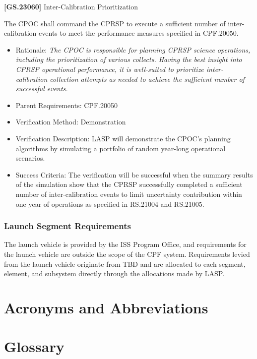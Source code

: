 \documentclass[12pt,oneside,oldfontcommands]{memoir}
\renewcommand{\entryname}{Acronym}
\renewcommand{\descriptionname}{Complete Term}
\begin{document}
\textbf{[GS.23060]} Inter-Calibration Prioritization

The \gls{CPOC} shall command the \gls{CPRSP} to execute a sufficient number of inter-calibration events to meet the performance \gls{measure}s specified in \gls{CPF}.20050.

\begin{itemize}
\item{} Rationale: \emph{The CPOC is responsible for planning CPRSP science operations, including the prioritization of various collects. Having the best insight into CPRSP operational performance, it is well-suited to prioritize inter-calibration collection attempts as needed to achieve the sufficient number of successful events.}

\item{} Parent Requirements: \gls{CPF}.20050

\item{} Verification Method: Demonstration

\item{} Verification Description: \gls{LASP} will demonstrate the \gls{CPOC}'s planning algorithms by simulating a portfolio of random year-long operational scenarios.

\item{} Success Criteria: The verification will be successful when the summary results of the simulation show that the \gls{CPRSP} successfully completed a sufficient number of inter-calibration events to limit uncertainty contribution within one year of operations as specified in \gls{RS}.21004 and \gls{RS}.21005.

\end{itemize}

\subsection{Launch Segment Requirements}
\label{launchsegmentrequirements}

The launch vehicle is provided by the \gls{ISS} Program Office, and requirements for the launch vehicle are outside the scope of the \gls{CPF} system. Requirements levied from the launch vehicle originate from TBD\label{tbx_2} and are allocated to each segment, element, and subsystem directly through the allocations made by \gls{LASP}.


\begin{appendices}


\chapter{Acronyms and Abbreviations  }
\label{sec_acros}

\printglossary[type=\acronymtype]

\chapter{Glossary  }
\label{sec_gls}


\renewcommand{\entryname}{Term}
\renewcommand{\descriptionname}{Definition}
\printglossary


\end{appendices}
\end{document}

